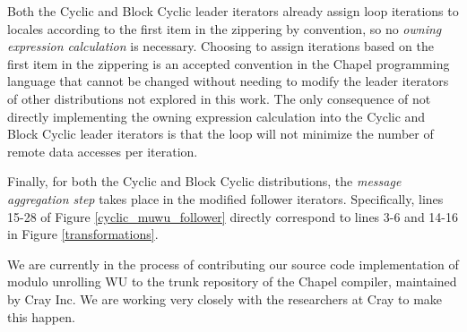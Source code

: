 Both the Cyclic and Block Cyclic leader iterators already assign loop iterations to locales according to the first item in the zippering by convention, so no \textit{owning expression calculation} is necessary. Choosing to assign iterations based on the first item in the zippering is an accepted convention in the Chapel programming language that cannot be changed without needing to modify the leader iterators of other distributions not explored in this work. The only consequence of not directly implementing the owning expression calculation into the Cyclic and Block Cyclic leader iterators is that the loop will not minimize the number of remote data accesses per iteration. 

Finally, for both the Cyclic and Block Cyclic distributions, the \textit{message aggregation step} takes place in the modified follower iterators. Specifically, lines 15-28 of Figure \ref{cyclic_muwu_follower} directly correspond to lines 3-6 and 14-16 in Figure \ref{transformations}.

We are currently in the process of contributing our source code implementation of modulo unrolling WU to the trunk repository of the Chapel compiler, maintained by Cray Inc. We are working very closely with the researchers at Cray to make this happen. 

